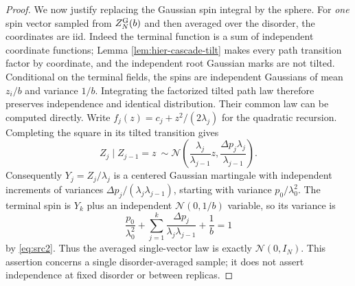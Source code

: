 \documentclass[11pt,a4paper]{article}
\numberwithin{equation}{section}
\theoremstyle{definition}
\theoremstyle{remark}
\newcommand{\cN}{\mathcal N}
\begin{document}
\begin{proof}
We now justify replacing the Gaussian spin integral by the sphere.
For \emph{one} spin vector sampled from $Z_N^{\rm G}(b)$ and then averaged
over the disorder, the coordinates are iid.  Indeed the terminal function
is a sum of independent coordinate functions; Lemma
\ref{lem:hier-cascade-tilt} makes every path transition factor by coordinate,
and the independent root Gaussian marks are not tilted.  Conditional on
the terminal fields, the spins are independent Gaussians of mean $z_i/b$
and variance $1/b$.  Integrating the factorized tilted path law therefore
preserves independence and identical distribution.  Their common law can
be computed directly.  Write $f_j(z)=c_j+z^2/(2\lambda_j)$ for the quadratic
recursion.  Completing the square in its tilted transition gives
\begin{equation}
 Z_j\mid Z_{j-1}=z\ \sim
 \cN\!\left(\frac{\lambda_j}{\lambda_{j-1}}z,
        \frac{\Delta p_j\lambda_j}{\lambda_{j-1}}\right).
 \label{eq:hier-spin-transition}
\end{equation}
Consequently $Y_j=Z_j/\lambda_j$ is a centered Gaussian martingale with
independent increments of variances
$\Delta p_j/(\lambda_j\lambda_{j-1})$, starting with variance
$p_0/\lambda_0^2$.  The terminal spin is $Y_k$ plus an independent
$\cN(0,1/b)$ variable, so its variance is
\[
 \frac{p_0}{\lambda_0^2}
 +\sum_{j=1}^k\frac{\Delta p_j}{\lambda_j\lambda_{j-1}}+\frac1b=1
\]
by \eqref{eq:src2}.  Thus the averaged single-vector law is exactly
$\cN(0,I_N)$.  This assertion concerns a single disorder-averaged sample;
it does not assert independence at fixed disorder or between replicas.


\end{proof}
\end{document}
